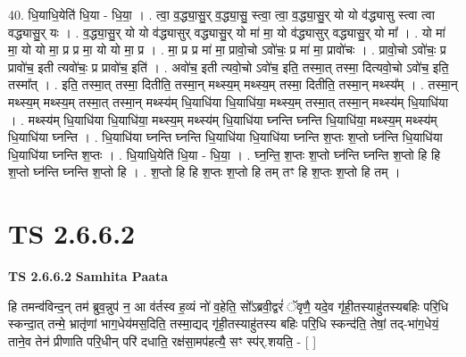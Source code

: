 \documentclass[17pt]{extarticle}
\begin{document}
40. धि॒याधि॒येति॑ धि॒या - धि॒या॒ । . त्वा॒ व॒द्ध्या॒सु॒र् व॒द्ध्या॒सु॒ स्त्वा॒ त्वा॒ व॒द्ध्या॒सु॒र् यो यो व॑द्ध्यासु स्त्वा त्वा वद्ध्यासु॒र् यः । . व॒द्ध्या॒सु॒र् यो यो व॑द्ध्यासुर् वद्ध्यासु॒र् यो मा॑ मा॒ यो व॑द्ध्यासुर् वद्ध्यासु॒र् यो मा᳚ । . यो मा॑ मा॒ यो यो मा॒ प्र प्र मा॒ यो यो मा॒ प्र । . मा॒ प्र प्र मा॑ मा॒ प्रावो॒चो ऽवो॑चः॒ प्र मा॑ मा॒ प्रावो॑चः । . प्रावो॒चो ऽवो॑चः॒ प्र प्रावो॑च॒ इती त्यवो॑चः॒ प्र प्रावो॑च॒ इति॑ । . अवो॑च॒ इती त्यवो॒चो ऽवो॑च॒ इति॒ तस्मा॒त् तस्मा॒ दित्यवो॒चो ऽवो॑च॒ इति॒ तस्मा᳚त् । . इति॒ तस्मा॒त् तस्मा॒ दितीति॒ तस्मा॒न् मथ्स्य॒म् मथ्स्य॒म् तस्मा॒ दितीति॒ तस्मा॒न् मथ्स्य᳚म् । . तस्मा॒न् मथ्स्य॒म् मथ्स्य॒म् तस्मा॒त् तस्मा॒न् मथ्स्य॑म् धि॒याधि॑या धि॒याधि॑या॒ मथ्स्य॒म् तस्मा॒त् तस्मा॒न् मथ्स्य॑म् धि॒याधि॑या । . मथ्स्य॑म् धि॒याधि॑या धि॒याधि॑या॒ मथ्स्य॒म् मथ्स्य॑म् धि॒याधि॑या घ्नन्ति घ्नन्ति धि॒याधि॑या॒ मथ्स्य॒म् मथ्स्य॑म् धि॒याधि॑या घ्नन्ति । . धि॒याधि॑या घ्नन्ति घ्नन्ति धि॒याधि॑या धि॒याधि॑या घ्नन्ति श॒प्तः श॒प्तो घ्न॑न्ति धि॒याधि॑या धि॒याधि॑या घ्नन्ति श॒प्तः । . धि॒याधि॒येति॑ धि॒या - धि॒या॒ । . घ्न॒न्ति॒ श॒प्तः श॒प्तो घ्न॑न्ति घ्नन्ति श॒प्तो हि हि श॒प्तो घ्न॑न्ति घ्नन्ति श॒प्तो हि । . श॒प्तो हि हि श॒प्तः श॒प्तो हि तम् तꣳ हि श॒प्तः श॒प्तो हि तम् । \newline
\pagebreak
{}

\section{ TS 2.6.6.2 }

\textbf{TS 2.6.6.2 } \newline
\textbf{Samhita Paata} \newline

हि तमन्व॑विन्द॒न् तम॑ ब्रुव॒न्नुप॑ न॒ आ व॑र्तस्व ह॒व्यं नो॑ व॒हेति॒ सो᳚ऽब्रवी॒द्वरं॑ ॅवृणै॒ यदे॒व गृ॑ही॒तस्याहु॑तस्यबहिः परि॒धि स्कन्दा॒त् तन्मे॒ भ्रातृ॑णां भाग॒धेय॑मस॒दिति॒ तस्मा॒द्यद् गृ॑ही॒तस्याहु॑तस्य बहिः परि॒धि स्कन्द॑ति॒ तेषां॒ तद्-भा॑ग॒धेयं॒ ताने॒व तेन॑ प्रीणाति परि॒धीन् परि॑ दधाति॒ रक्ष॑सा॒मप॑हत्यै॒ सꣳ स्प॑र्.शयति॒ - [  ] \newline
\end{document}
